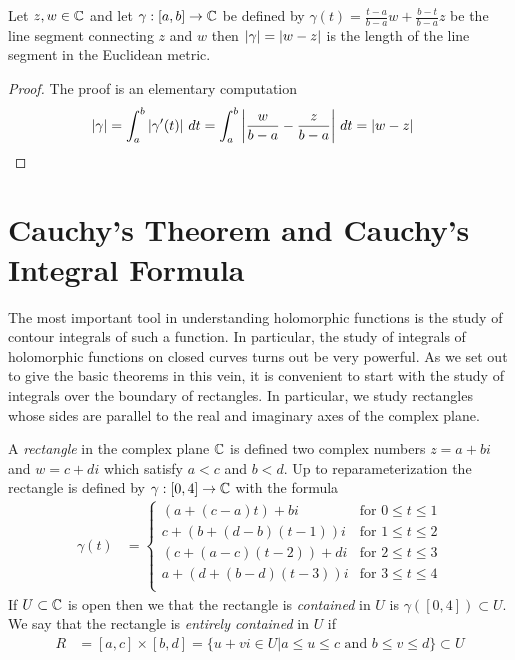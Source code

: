 \begin{examp}\label{banach:ArclengthOfLineSegment}Let $z, w \in \mathbb{C}$ and let $\gamma : [a,b] \to \mathbb{C}$ be defined by $\gamma(t) = \frac{t-a}{b-a}w + \frac{b -t}{b-a}z$ be the
  line segment connecting $z$ and $w$ then $\left \vert \gamma \right \vert = \left \vert w -z \right \vert$ is the length of the line segment in the Euclidean metric.
\end{examp}
\begin{proof}
  The proof is an elementary computation
  \begin{align*}
    \left \vert \gamma \right \vert &=  \int_a^b \left \vert \gamma^\prime(t) \right \vert \, dt = \int_a^b \left \vert \frac{w}{b-a} - \frac{z}{b-a} \right \vert \, dt = \left \vert w - z \right \vert
   \end{align*}
\end{proof}

\section{Cauchy's Theorem and Cauchy's Integral Formula}

The most important tool in understanding holomorphic functions is the study of contour integrals of such a function.   In particular, the study of integrals of holomorphic functions on closed curves turns out be very powerful.   As we set out to give the basic theorems in this vein, it is convenient to start with the study of integrals over the boundary of rectangles.   In particular, we study rectangles whose sides are parallel to the real and imaginary axes of the complex plane.

\begin{defn}A \emph{rectangle} in the complex plane $\mathbb{C}$ is defined two complex numbers $z = a+bi$ and $w = c + di$ which satisfy $a < c$ and $b < d$.   Up to reparameterization the rectangle is defined by $\gamma : [0,4] \to \mathbb{C}$ with the formula
\begin{align*}
\gamma(t) &= \begin{cases}
(a + (c - a) t) + bi & \text{for $0 \leq t \leq 1$} \\
c + (b + (d-b)(t-1))i & \text{for $1 \leq t \leq 2$} \\
(c + (a - c) (t - 2)) + di & \text{for $2 \leq t \leq 3$} \\
a + (d + (b-d)(t-3))i & \text{for $3 \leq t \leq 4$} \\
\end{cases}
\end{align*}
If $U \subset \mathbb{C}$ is open then we that the rectangle is \emph{contained} in $U$ is $\gamma([0,4]) \subset U$.   We say that the rectangle is \emph{entirely contained} in $U$ if 
\begin{align*}
R &=[a,c] \times [b,d] = \lbrace u + vi \in U | a \leq u \leq c \text{ and } b \leq v \leq d \rbrace \subset U
\end{align*}
\end{defn}

